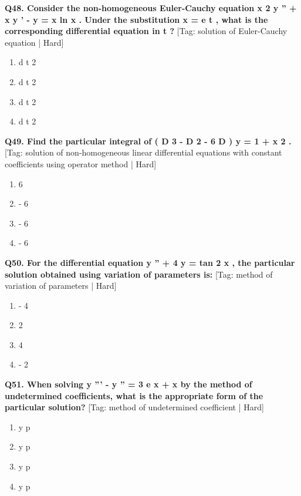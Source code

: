 \noindent\textbf{Q48. Consider the non-homogeneous Euler-Cauchy equation x 2 y '' + x y ' - y = x ln x . Under the substitution x = e t , what is the corresponding differential equation in t ?} \hfill [Tag: solution of Euler-Cauchy equation | Hard]
\begin{enumerate}[label=(\alph*),topsep=2pt,itemsep=1pt,partopsep=0pt,parsep=0pt]
    \item {{d t 2}}
    \item {{d t 2}}
    \item {{d t 2}}
    \item {{d t 2}}
\end{enumerate}
\vspace{2mm}

\noindent\textbf{Q49. Find the particular integral of ( D 3 - D 2 - 6 D ) y = 1 + x 2 .} \hfill [Tag: solution of non-homogeneous linear differential equations with constant coefficients using operator method | Hard]
\begin{enumerate}[label=(\alph*),topsep=2pt,itemsep=1pt,partopsep=0pt,parsep=0pt]
    \item {{6}}
    \item {{- 6}}
    \item {{- 6}}
    \item {{- 6}}
\end{enumerate}
\vspace{2mm}

\noindent\textbf{Q50. For the differential equation y '' + 4 y = tan 2 x , the particular solution obtained using variation of parameters is:} \hfill [Tag: method of variation of parameters | Hard]
\begin{enumerate}[label=(\alph*),topsep=2pt,itemsep=1pt,partopsep=0pt,parsep=0pt]
    \item {{- 4}}
    \item {{2}}
    \item {{4}}
    \item {{- 2}}
\end{enumerate}
\vspace{2mm}

\noindent\textbf{Q51. When solving y ''' - y '' = 3 e x + x by the method of undetermined coefficients, what is the appropriate form of the particular solution?} \hfill [Tag: method of undetermined coefficient | Hard]
\begin{enumerate}[label=(\alph*),topsep=2pt,itemsep=1pt,partopsep=0pt,parsep=0pt]
    \item {{y p}}
    \item {{y p}}
    \item {{y p}}
    \item {{y p}}
\end{enumerate}
\vspace{2mm}

